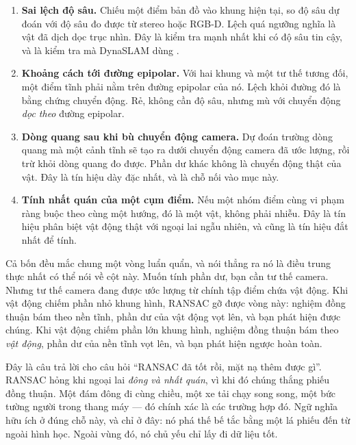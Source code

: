 \documentclass[../../deep_learning.tex]{subfiles}
\begin{document}
\begin{enumerate}
\item \textbf{Sai lệch độ sâu.} Chiếu một điểm bản đồ vào khung hiện tại, so độ sâu dự đoán với độ sâu đo được từ stereo hoặc RGB-D. Lệch quá ngưỡng nghĩa là vật đã dịch dọc trục nhìn. Đây là kiểm tra mạnh nhất khi có độ sâu tin cậy, và là kiểm tra mà DynaSLAM dùng \cite{bescos2018dynaslam}.
\item \textbf{Khoảng cách tới đường epipolar.} Với hai khung và một tư thế tương đối, một điểm tĩnh phải nằm trên đường epipolar của nó. Lệch khỏi đường đó là bằng chứng chuyển động. Rẻ, không cần độ sâu, nhưng mù với chuyển động \emph{dọc theo} đường epipolar.
\item \textbf{Dòng quang sau khi bù chuyển động camera.} Dự đoán trường dòng quang mà một cảnh tĩnh sẽ tạo ra dưới chuyển động camera đã ước lượng, rồi trừ khỏi dòng quang đo được. Phần dư khác không là chuyển động thật của vật. Đây là tín hiệu dày đặc nhất, và là chỗ  nối vào mục này.
\item \textbf{Tính nhất quán của một cụm điểm.} Nếu một nhóm điểm cùng vi phạm ràng buộc theo cùng một hướng, đó là một vật, không phải nhiễu. Đây là tín hiệu phân biệt vật động thật với ngoại lai ngẫu nhiên, và cũng là tín hiệu đắt nhất để tính.
\end{enumerate}

Cả bốn đều mắc chung một vòng luẩn quẩn, và nói thẳng ra nó là điều trung thực nhất có thể nói về cột này. Muốn tính phần dư, bạn cần tư thế camera. Nhưng tư thế camera đang được ước lượng từ chính tập điểm chứa vật động. Khi vật động chiếm phần nhỏ khung hình, RANSAC gỡ được vòng này: nghiệm đồng thuận bám theo nền tĩnh, phần dư của vật động vọt lên, và bạn phát hiện được chúng. Khi vật động chiếm phần lớn khung hình, nghiệm đồng thuận bám theo \emph{vật động}, phần dư của nền tĩnh vọt lên, và bạn phát hiện ngược hoàn toàn.

\begin{cannho}
Đây là câu trả lời cho câu hỏi ``RANSAC đã tốt rồi, mặt nạ thêm được gì''. RANSAC hỏng khi ngoại lai \emph{đông và nhất quán}, vì khi đó chúng thắng phiếu đồng thuận. Một đám đông đi cùng chiều, một xe tải chạy song song, một bức tường người trong thang máy --- đó chính xác là các trường hợp đó. Ngữ nghĩa hữu ích ở đúng chỗ này, và chỉ ở đây: nó phá thế bế tắc bằng một lá phiếu đến từ ngoài hình học. Ngoài vùng đó, nó chủ yếu chỉ lấy đi dữ liệu tốt. 
\end{cannho}
\end{document}
